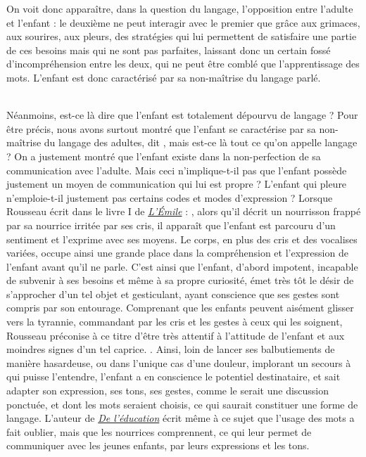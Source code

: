 \documentclass[a4paper,french,bookmarks]{article}
\begin{document}
\qquad On voit donc apparaître, dans la question du langage, l'opposition entre l'adulte et l'enfant : le deuxième ne peut interagir avec le premier que grâce aux grimaces, aux sourires, aux pleurs, des stratégies qui lui permettent de satisfaire une partie de ces besoins mais qui ne sont pas parfaites, laissant donc un certain fossé d'incompréhension entre les deux, qui ne peut être comblé que l'apprentissage des mots. L'enfant est donc caractérisé par sa non-maîtrise du langage parlé.

\text{}\\[20pt]

\qquad Néanmoins, est-ce là dire que l'enfant est totalement dépourvu de langage ? Pour être précis, nous avons surtout montré que l'enfant se caractérise par sa non-maîtrise du langage des adultes, dit , mais est-ce là tout ce qu'on appelle langage ? On a justement montré que l'enfant existe dans la non-perfection de sa communication avec l'adulte. Mais ceci n'implique-t-il pas que l'enfant possède justement un moyen de communication qui lui est propre ? L'enfant qui pleure n'emploie-t-il justement pas certains codes et modes d'expression ? Lorsque Rousseau écrit dans le livre I de \underline{\itshape L'Émile} : , alors qu'il décrit un nourrisson frappé par sa nourrice irritée par ses cris, il apparaît que l'enfant est parcouru d'un sentiment et l'exprime avec ses moyens. Le corps, en plus des cris et des vocalises variées, occupe ainsi une grande place dans la compréhension et l'expression de l'enfant avant qu'il ne parle. C'est ainsi que l'enfant, d'abord impotent, incapable de subvenir à ses besoins et même à sa propre curiosité, émet très tôt le désir de s'approcher d'un tel objet et gesticulant, ayant conscience que ses gestes sont compris par son entourage. Comprenant que les enfants peuvent aisément glisser vers la tyrannie, commandant par les cris et les gestes à ceux qui les soignent, Rousseau préconise à ce titre d'être très attentif à l'attitude de l'enfant et aux moindres signes d'un tel caprice. .  Ainsi, loin de lancer ses balbutiements de manière hasardeuse, ou dans l'unique cas d'une douleur, implorant un secours à qui puisse l'entendre, l'enfant a en conscience le potentiel destinataire, et sait adapter son expression, ses tons, ses gestes, comme le serait une discussion ponctuée, et dont les mots seraient choisis, ce qui saurait constituer une forme de langage. L'auteur de \underline{\itshape De l'éducation} écrit même à ce sujet  que l'usage des mots a fait oublier, mais que les nourrices comprennent, ce qui leur permet de communiquer avec les jeunes enfants, par leurs expressions et les tons. 
\end{document}

